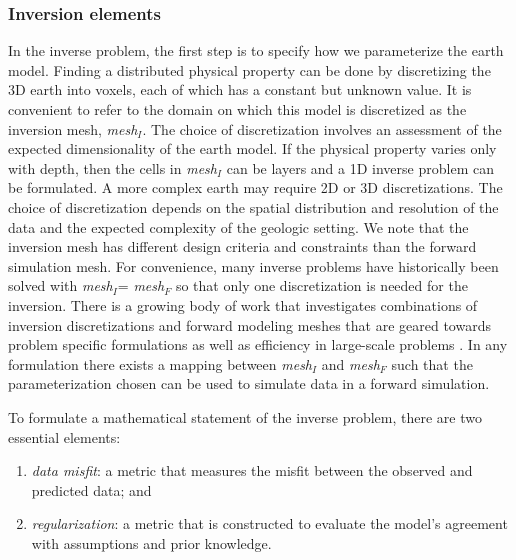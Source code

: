 \documentclass[preprint,review,3p,times,onecolumn,authoryear]{elsarticle}
\newcommand{\meshI}{\emph{mesh}$_I$\xspace}
\newcommand{\meshF}{\emph{mesh}$_F$\xspace}
\begin{document}
\subsubsection*{Inversion elements}


In the inverse problem, the first step is to specify how we parameterize the
earth model. Finding a distributed physical property can be done by
discretizing the 3D earth into voxels, each of which has a constant but unknown value.
It is convenient to refer to the domain on which this model is discretized as the inversion mesh, \meshI.
The choice of discretization involves an assessment of the expected dimensionality of
the earth model. If the physical property varies only with depth, then
the cells in \meshI can be layers and a 1D inverse problem can be formulated. A more
complex earth may require 2D or 3D discretizations.
The choice of discretization depends on the spatial distribution and resolution of the
data and the expected complexity of the geologic setting.
We note that the inversion mesh has different design criteria and constraints than the
forward simulation mesh. For convenience, many inverse problems have
historically been solved with \meshI = \meshF so that only one discretization is needed for the inversion.
There is a growing body of work that investigates combinations of inversion discretizations and
forward modeling meshes that are geared towards
problem specific formulations %
as well as efficiency in large-scale problems \citep{Haber2014,Yang2014, HaHe06}. %
In any formulation there exists a mapping between \meshI and \meshF such that the
parameterization chosen can be used to simulate data in a forward simulation.

To formulate a mathematical statement of the inverse problem, there are two essential elements:
\begin{enumerate}
    \item \emph{data misfit}: a metric that measures the misfit between the observed and predicted data; and
    \item \emph{regularization}: a metric that is constructed to evaluate the model's agreement with assumptions and prior knowledge.
\end{enumerate}
\end{document}
